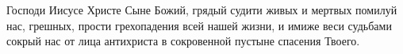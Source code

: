 \mychapterending

\begin{mymulticols}



Господи Иисусе Христе Сыне Божий, грядый судити живых и мертвых помилуй нас, грешных, прости грехопадения всей нашей жизни, и имиже веси судьбами сокрый нас от лица антихриста в сокровенной пустыне спасения Твоего.

\end{mymulticols}

\mychapterending

